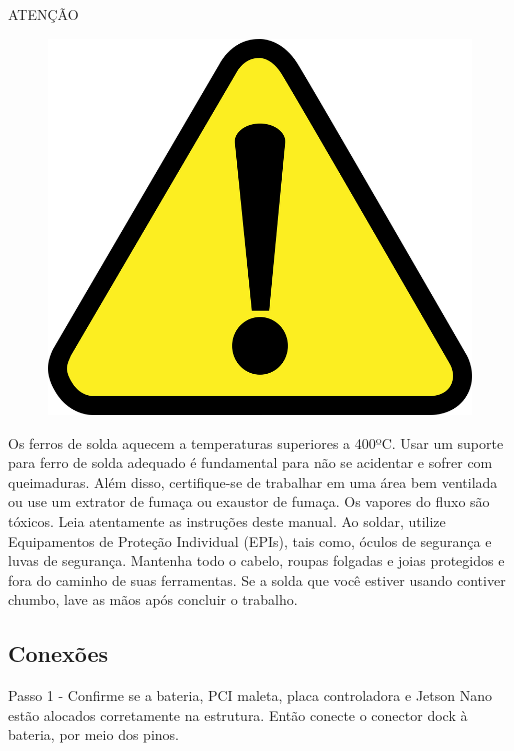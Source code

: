 \begin{center}
ATENÇÃO
\begin{figure}[H]
 \centering
 \includegraphics[scale = 0.1]{Figuras/atenção.png}
\end{figure}
\end{center}

\par Os ferros de solda aquecem a temperaturas superiores a 400ºC. Usar um suporte para ferro de solda adequado é fundamental para não se acidentar e sofrer com queimaduras. Além disso, certifique-se de trabalhar em uma área bem ventilada ou use um extrator de fumaça ou exaustor de fumaça. Os vapores do fluxo são tóxicos. Leia atentamente as instruções deste manual. Ao soldar, utilize Equipamentos de Proteção Individual (EPIs), tais como, óculos de segurança e luvas de segurança. Mantenha todo o cabelo, roupas folgadas e joias protegidos e fora do caminho de suas ferramentas. Se a solda que você estiver usando contiver chumbo, lave as mãos após concluir o trabalho.

\subsection*{Conexões}

Passo 1 - Confirme se a bateria, PCI maleta, placa controladora e Jetson Nano estão alocados corretamente na estrutura. Então conecte o conector dock à bateria, por meio dos pinos.

